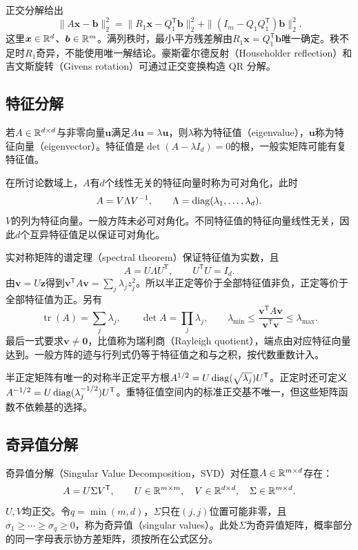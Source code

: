 正交分解给出
\begin{equation}
 \|A\bm x-\bm b\|_2^2=\|R_1\bm x-Q_1^{\mathsf T}\bm b\|_2^2
 +\|(I_m-Q_1Q_1^{\mathsf T})\bm b\|_2^2.
\end{equation}
这里$\bm x\in\mathbb{R}^d$、$\bm b\in\mathbb{R}^m$。满列秩时，最小平方残差解由$R_1\bm x=Q_1^{\mathsf T}\bm b$唯一确定。秩不足时$R_1$奇异，不能使用唯一解结论。豪斯霍尔德反射（Householder reflection）和吉文斯旋转（Givens rotation）可通过正交变换构造 QR 分解。

\subsection{特征分解}
若$A\in\mathbb{R}^{d\times d}$与非零向量$\bm u$满足$A\bm u=\lambda\bm u$，则$\lambda$称为特征值（eigenvalue），$\bm u$称为特征向量（eigenvector）。特征值是$\det(A-\lambda I_d)=0$的根，一般实矩阵可能有复特征值。

在所讨论数域上，$A$有$d$个线性无关的特征向量时称为可对角化，此时
\begin{equation}
 A=V\Lambda V^{-1},\qquad\Lambda=\operatorname{diag}(\lambda_1,\ldots,\lambda_d).
\end{equation}
$V$的列为特征向量。一般方阵未必可对角化。不同特征值的特征向量线性无关，因此$d$个互异特征值足以保证可对角化。

实对称矩阵的谱定理（spectral theorem）保证特征值为实数，且
\begin{equation}
 A=U\Lambda U^{\mathsf T},\qquad U^{\mathsf T}U=I_d.
\end{equation}
由$\bm v=U\bm z$得到$\bm v^{\mathsf T}A\bm v=\sum_j\lambda_jz_j^2$。所以半正定等价于全部特征值非负，正定等价于全部特征值为正。另有
\begin{equation}
 \operatorname{tr}(A)=\sum_j\lambda_j,\qquad\det A=\prod_j\lambda_j,\qquad
 \lambda_{\min}\leq\frac{\bm v^{\mathsf T}A\bm v}{\bm v^{\mathsf T}\bm v}\leq\lambda_{\max}.
\end{equation}
最后一式要求$\bm v\ne\bm0$，比值称为瑞利商（Rayleigh quotient），端点由对应特征向量达到。一般方阵的迹与行列式仍等于特征值之和与之积，按代数重数计入。

半正定矩阵有唯一的对称半正定平方根$A^{1/2}=U\operatorname{diag}(\sqrt{\lambda_j})U^{\mathsf T}$。正定时还可定义$A^{-1/2}=U\operatorname{diag}(\lambda_j^{-1/2})U^{\mathsf T}$。重特征值空间内的标准正交基不唯一，但这些矩阵函数不依赖基的选择。

\subsection{奇异值分解}
奇异值分解（Singular Value Decomposition，SVD）对任意$A\in\mathbb{R}^{m\times d}$存在：
\begin{equation}
 A=U\Sigma V^{\mathsf T},\qquad U\in\mathbb{R}^{m\times m},\quad
 V\in\mathbb{R}^{d\times d},\quad\Sigma\in\mathbb{R}^{m\times d}.
\end{equation}
$U,V$均正交。令$q=\min(m,d)$，$\Sigma$只在$(j,j)$位置可能非零，且$\sigma_1\geq\cdots\geq\sigma_q\geq0$，称为奇异值（singular values）。此处$\Sigma$为奇异值矩阵，概率部分的同一字母表示协方差矩阵，须按所在公式区分。

